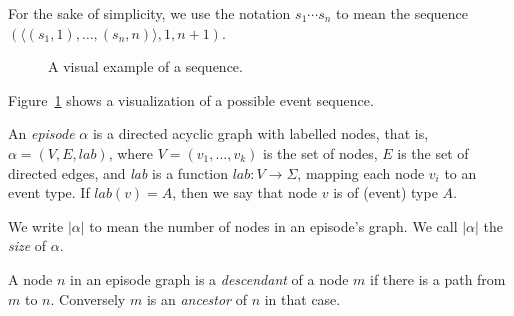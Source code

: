 For the sake of simplicity, we use the notation $ s_1 \cdots s_n $ to mean the sequence $ (\langle (s_1, 1), \ldots,\allowbreak(s_n, n) \rangle, 1, n + 1) $.

\begin{figure}
\centering


\caption{A visual example of a sequence.}

\label{fig:event-sequence}
\end{figure}

Figure~\ref{fig:event-sequence} shows a visualization of a possible event sequence.

\begin{definition}
An \emph{episode} $ \alpha $ is a directed acyclic graph with labelled nodes, that is, $ \alpha = (V, E, lab) $, where $ V = (v_1, \ldots, v_k) $ is the set of nodes, $ E $ is the set of directed edges, and \emph{lab} is a function $ lab \colon V \rightarrow \Sigma $, mapping each node $ v_i $ to an event type. If $ lab(v) = A $, then we say that node $ v $ is of (event) type $ A $.
\end{definition}

We write $ | \alpha | $ to mean the number of nodes in an episode's graph. We call $ | \alpha | $ the \emph{size} of $ \alpha $.

\begin{definition}
A node $ n $ in an episode graph is a \emph{descendant} of a node $ m $ if there is a path from $ m $ to $ n $. Conversely $ m $ is an \emph{ancestor} of $ n $ in that case.
\end{definition}

